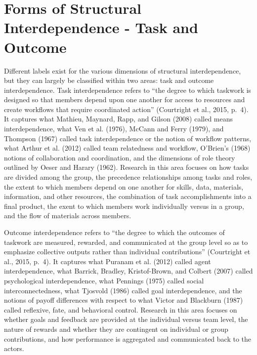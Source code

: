 \documentclass[english,,man]{apa6}
\theoremstyle{definition}
\theoremstyle{definition}
\theoremstyle{definition}
\theoremstyle{remark}
\begin{document}
\hypertarget{forms-of-structural-interdependence---task-and-outcome}{%
\section{Forms of Structural Interdependence - Task and
Outcome}\label{forms-of-structural-interdependence---task-and-outcome}}

Different labels exist for the various dimensions of structural
interdependence, but they can largely be classified within two areas:
task and outcome interdependence. Task interdependence refers to
\enquote{the degree to which taskwork is designed so that members depend
upon one another for access to resources and create workflows that
require coordinated action} (Courtright et al., 2015, p.~4). It captures
what Mathieu, Maynard, Rapp, and Gilson (2008) called means
interdependence, what Ven et al. (1976), McCann and Ferry (1979), and
Thompson (1967) called task interdependence or the notion of workflow
patterns, what Arthur et al. (2012) called team relatedness and
workflow, O'Brien's (1968) notions of collaboration and coordination,
and the dimensions of role theory outlined by Oeser and Harary (1962).
Research in this area focuses on how tasks are divided among the group,
the precedence relationships among tasks and roles, the extent to which
members depend on one another for skills, data, materials, information,
and other resources, the combination of task accomplishments into a
final product, the exent to which members work individually versus in a
group, and the flow of materials across members.

Outcome interdependence refers to \enquote{the degree to which the
outcomes of taskwork are measured, rewarded, and communicated at the
group level so as to emphasize collective outputs rather than individual
contributions} (Courtright et al., 2015, p.~4). It captures what Puranam
et al. (2012) called agent interdependence, what Barrick, Bradley,
Kristof-Brown, and Colbert (2007) called psychological interdependence,
what Pennings (1975) called social interconnectedness, what Tjosvold
(1986) called goal interdependence, and the notions of payoff
differences with respect to what Victor and Blackburn (1987) called
reflexive, fate, and behavioral control. Research in this area focuses
on whether goals and feedback are provided at the individual versus team
level, the nature of rewards and whether they are contingent on
individual or group contributions, and how performance is aggregated and
communicated back to the actors.
\end{document}
